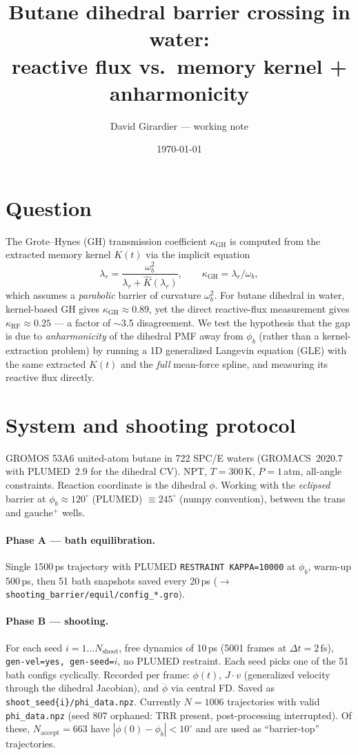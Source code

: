 \documentclass[11pt]{article}
\title{Butane dihedral barrier crossing in water:\\
       reactive flux vs.\ memory kernel + anharmonicity}
\author{David Girardier --- working note}
\date{\today}
\newcommand{\fs}{\mathrm{fs}}
\newcommand{\GH}{\mathrm{GH}}
\newcommand{\RF}{\mathrm{RF}}
\begin{document}
\maketitle

\section{Question}

The Grote--Hynes (GH) transmission coefficient $\kappa_\GH$ is computed
from the extracted memory kernel $K(t)$ via the implicit equation
\begin{equation}
\lambda_r = \frac{\omega_b^2}{\lambda_r + \widehat{K}(\lambda_r)},
\qquad
\kappa_\GH = \lambda_r/\omega_b,
\label{eq:gh}
\end{equation}
which assumes a \emph{parabolic} barrier of curvature $\omega_b^2$.
For butane dihedral in water, kernel-based GH gives $\kappa_\GH \approx 0.89$,
yet the direct reactive-flux measurement gives $\kappa_\RF \approx 0.25$
--- a factor of $\sim$3.5 disagreement. We test the hypothesis that the
gap is due to \emph{anharmonicity} of the dihedral PMF away from $\phi_b$
(rather than a kernel-extraction problem) by running a 1D generalized
Langevin equation (GLE) with the same extracted $K(t)$ and the
\emph{full} mean-force spline, and measuring its reactive flux directly.

\section{System and shooting protocol}

GROMOS 53A6 united-atom butane in 722 SPC/E waters
(GROMACS~2020.7 with PLUMED~2.9 for the dihedral CV). NPT, $T = 300$\,K,
$P = 1$\,atm, all-angle constraints. Reaction coordinate is the dihedral
$\phi$. Working with the \emph{eclipsed} barrier at
$\phi_b \approx 120^\circ$ (PLUMED) $\equiv 245^\circ$ (numpy convention),
between the trans and gauche$^+$ wells.

\paragraph{Phase A --- bath equilibration.}
Single 1500\,ps trajectory with PLUMED \texttt{RESTRAINT KAPPA=10000} at
$\phi_b$, warm-up 500\,ps, then 51 bath snapshots saved every 20\,ps
($\rightarrow$ \texttt{shooting\_barrier/equil/config\_*.gro}).

\paragraph{Phase B --- shooting.}
For each seed $i = 1\dots N_\mathrm{shoot}$, free dynamics of 10\,ps
(5001 frames at $\Delta t = 2\,\fs$), \texttt{gen-vel=yes,
gen-seed=$i$}, no PLUMED restraint. Each seed picks one of the 51 bath
configs cyclically. Recorded per frame: $\phi(t)$, $J\!\cdot\!v$
(generalized velocity through the dihedral Jacobian), and
$\ddot\phi$ via central FD. Saved as
\texttt{shoot\_seed\{i\}/phi\_data.npz}.
Currently $N = 1006$ trajectories with valid \texttt{phi\_data.npz}
(seed 807 orphaned: TRR present, post-processing interrupted). Of these,
$N_\mathrm{accept} = 663$ have $|\phi(0) - \phi_b| < 10^\circ$ and are
used as ``barrier-top'' trajectories.
\end{document}
